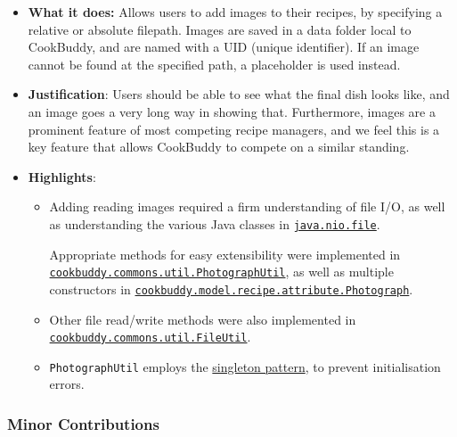 \documentclass[11pt,british]{article}
\begin{document}
\begin{itemize}
    \item \textbf{What it does:} Allows users to add images to their recipes, by specifying a relative or absolute
    filepath. Images are saved in a data folder local to CookBuddy, and are named with a
    UID (unique identifier). If an image cannot be found at the specified path, a placeholder is used instead.
    
    \item \textbf{Justification}: Users should be able to see what the final dish looks
    like, and an image goes a very long way in showing that. Furthermore, images are a prominent feature of most competing recipe managers, and we feel this is a key feature that allows CookBuddy to compete on a similar standing.
    
    \item \textbf{Highlights}:
    \begin{itemize}
    	\item Adding reading images required a firm understanding of file I/O, as well as understanding the various Java classes in \href{https://docs.oracle.com/en/java/javase/13/docs/api/java.base/java/nio/file/package-summary.html}{\texttt{java.nio.file}}. 
    	
    	Appropriate methods for easy extensibility were implemented in \href{https://github.com/AY1920S2-CS2103T-W12-4/main/blob/master/src/main/java/cookbuddy/commons/util/PhotographUtil.java}{\texttt{cookbuddy.commons.util.PhotographUtil}}, as well as multiple constructors in \href{https://github.com/AY1920S2-CS2103T-W12-4/main/blob/master/src/main/java/cookbuddy/model/recipe/attribute/Photograph.java}{\texttt{cookbuddy.model.recipe.attribute.Photograph}}.
    	
    	\item Other file read/write methods were also implemented in \href{https://github.com/AY1920S2-CS2103T-W12-4/main/blob/master/src/main/java/cookbuddy/commons/util/FileUtil.java}{\texttt{cookbuddy.commons.util.FileUtil}}.
    	
    	\item \texttt{PhotographUtil} employs the \href{https://en.wikipedia.org/wiki/Singleton_pattern}{singleton pattern}, to prevent initialisation errors.
    \end{itemize} 
\end{itemize}

\subsubsection{Minor Contributions}
\end{document}
